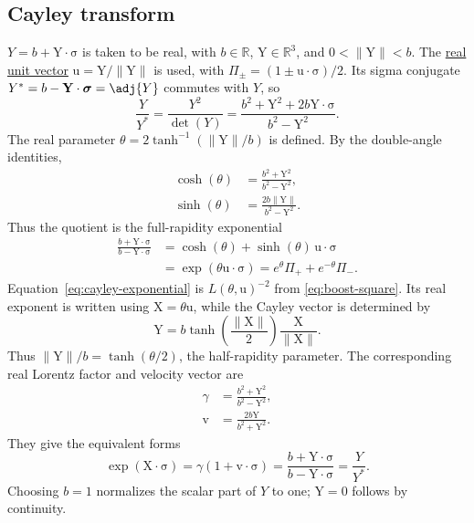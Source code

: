 \documentclass[11pt]{article}
\newcommand{\pv}[1]{{#1}}
\newcommand{\pvGreek}[1]{{#1}}
\newcommand{\vstyle}[1]{{\bm{\mathrm{#1}}}}
\newcommand{\pL}{\pv{L}}
\newcommand{\pY}{\pv{Y}}
\newcommand{\pvPi}{\pvGreek{\Pi}}
\numberwithin{equation}{section}
\newcommand{\R}{\mathbb{R}}
\newcommand{\dotprod}{\cdot}
\newcommand{\bsig}{\vstyle{\sigma}}
\newcommand{\bX}{\vstyle{X}}
\newcommand{\bY}{\vstyle{Y}}
\newcommand{\bv}{\vstyle{v}}
\newcommand{\bu}{\vstyle{u}}
\begin{document}
\subsection{Cayley transform}
$\pY=b+\bY\dotprod\bsig$ is taken to be real, with $b\in\R$, $\bY\in\R^3$, and
$0<\lVert\bY\rVert<b$.  The \hyperref[def:real-unit-vector]{real unit vector}
$\bu=\bY/\lVert\bY\rVert$ is used, with
$\pvPi_\pm=(1\pm\bu\dotprod\bsig)/2$.  Its sigma conjugate
$\pY^*=b-\bY\dotprod\bsig=\adj {\pY}$ commutes with $\pY$, so
\[
 \frac{\pY}{\pY^*}=\frac{\pY^2}{\det(\pY)}
 =\frac{b^2+\bY^2+2b\bY\dotprod\bsig}{b^2-\bY^2}.
\]
The real parameter $\theta=2\tanh^{-1}(\lVert\bY\rVert/b)$ is defined.
By the double-angle identities,
\begin{align*}
 \cosh(\theta)&=\frac{b^2+\bY^2}{b^2-\bY^2},\\
 \sinh(\theta)&=\frac{2b\lVert\bY\rVert}{b^2-\bY^2}.
\end{align*}
Thus the quotient is the full-rapidity exponential
\begin{equation}
 \begin{aligned}
 \frac{b+\bY\dotprod\bsig}{b-\bY\dotprod\bsig}
 &=\cosh(\theta)+\sinh(\theta)\,\bu\dotprod\bsig\\
 &=\exp(\theta\bu\dotprod\bsig)
 =e^\theta\pvPi_++e^{-\theta}\pvPi_-.
 \end{aligned}
 \label{eq:cayley-exponential}
\end{equation}
Equation~\eqref{eq:cayley-exponential} is $\pL(\theta,\bu)^{-2}$ from
\eqref{eq:boost-square}. Its real exponent is written using
$\bX=\theta\bu$, while the Cayley vector is determined by
\begin{equation*}
 \bY=b\tanh\left(\frac{\lVert\bX\rVert}{2}\right)
       \frac{\bX}{\lVert\bX\rVert}.
\end{equation*}
Thus $\lVert\bY\rVert/b=\tanh(\theta/2)$, the half-rapidity
parameter.  The corresponding real Lorentz factor and velocity vector are
\begin{align*}
 \gamma&=\frac{b^2+\bY^2}{b^2-\bY^2},\\
 \bv&=\frac{2b\bY}{b^2+\bY^2}.
\end{align*}
They give the equivalent forms
\[
 \exp(\bX\dotprod\bsig)=\gamma(1+\bv\dotprod\bsig)
 =\frac{b+\bY\dotprod\bsig}{b-\bY\dotprod\bsig}=\frac{\pY}{\pY^*}.
\]
Choosing $b=1$ normalizes the scalar part of $\pY$ to one; $\bY=0$ follows by
continuity.
\end{document}
